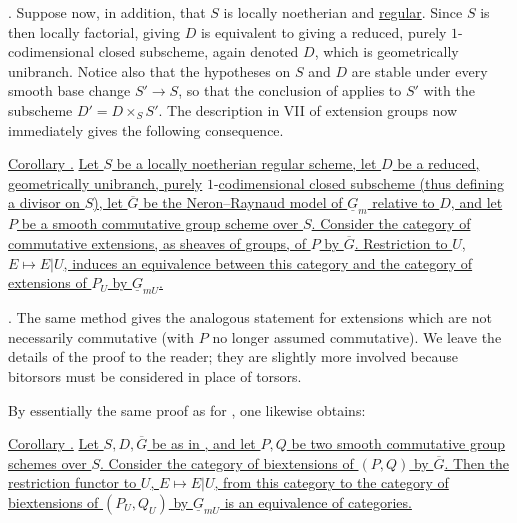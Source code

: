 \medskip
\noindent {}.  Suppose now, in addition, that $S$ is locally noetherian
and \underline{regular}.  Since $S$ is then locally factorial, giving $D$
is equivalent to giving a reduced, purely $1$-codimensional closed
subscheme, again denoted $D$, which is geometrically unibranch.  Notice also
that the hypotheses on $S$ and $D$ are stable under every smooth base change
$S'\to S$, so that the conclusion of  applies to $S'$ with the subscheme
$D'=D\times_S S'$.  The description in VII  of extension groups now
immediately gives the following consequence.

\medskip
\noindent\underline{Corollary .}  \underline{Let $S$ be a locally
noetherian regular scheme, let $D$ be a reduced, geometrically unibranch,
purely} $1$-\underline{codimensional closed subscheme (thus defining a divisor on $S$),
let $\overline G$ be the Neron--Raynaud model of $\underline G_m$ relative
to $D$, and let $P$ be a smooth commutative group scheme over $S$.  Consider
the category of commutative extensions, as sheaves of groups, of $P$ by
$\overline G$.  Restriction to $U$, $E\mapsto E|U$, induces an equivalence
between this category and the category of extensions of $P_U$ by
$\underline G_{mU}$.}

\medskip
\noindent {}.  The same method gives the analogous statement for
extensions which are not necessarily commutative (with $P$ no longer
assumed commutative).  We leave the details of the proof to the reader; they
are slightly more involved because bitorsors must be considered in place of
torsors.

By essentially the same proof as for , one likewise obtains:

\medskip
\noindent\underline{Corollary .}  \underline{Let $S,D,\overline G$ be as
in , and let $P,Q$ be two smooth commutative group schemes over $S$.
Consider the category of biextensions of $(P,Q)$ by $\overline G$.  Then the
restriction functor to $U$, $E\mapsto E|U$, from this category to the
category of biextensions of $(P_U,Q_U)$ by $\underline G_{mU}$ is an
equivalence of categories.}

